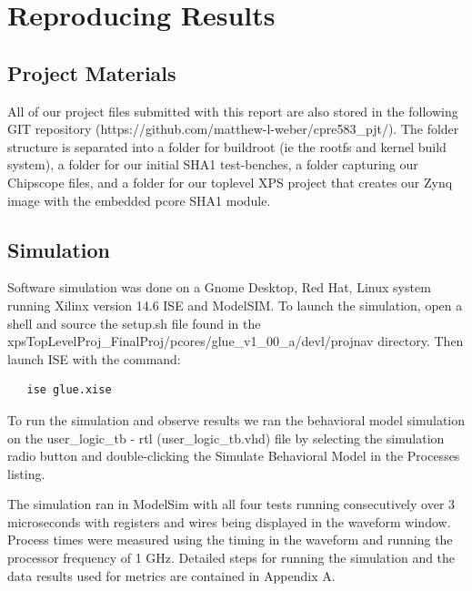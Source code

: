\documentclass[journal]{IEEEtran}
\begin{document}
\section{Reproducing Results}
\subsection{Project Materials}
All of our project files submitted with this report are also stored in the following GIT repository (https://github.com/matthew-l-weber/cpre583\_pjt/).  The folder structure is separated into a folder for buildroot (ie the rootfs and kernel build system), a folder for our initial SHA1 test-benches, a folder capturing our Chipscope files, and a folder for our toplevel XPS project that creates our Zynq image with the embedded pcore SHA1 module. 
\subsection{Simulation}
Software simulation was done on a Gnome Desktop, Red Hat, Linux system running Xilinx version 14.6 ISE and ModelSIM.  To launch the simulation, open a shell and source the setup.sh file found in the xpsTopLevelProj\_FinalProj/pcores/glue\_v1\_00\_a/devl/projnav directory.  Then launch ISE with the command:
\begin{verbatim}
   ise glue.xise
\end{verbatim}
To run the simulation and observe results we ran the behavioral model simulation on the  user\_logic\_tb - rtl (user\_logic\_tb.vhd) file by selecting the simulation radio button and double-clicking the Simulate Behavioral Model in the Processes listing.

The simulation ran in ModelSim with all four tests running consecutively over 3 microseconds with registers and wires being displayed in the waveform window.  Process times were measured using the timing in the waveform and running the processor frequency of 1 GHz. Detailed steps for running the simulation and the data results used for metrics are contained in Appendix A.
\end{document}
